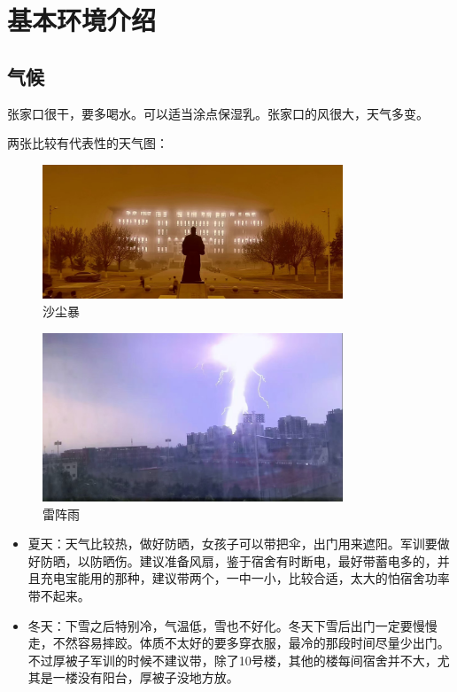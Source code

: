 \documentclass[12pt]{article} %
\begin{document}
	
\section{基本环境介绍} 
	\subsection{气候}
	
	张家口很干，要多喝水。可以适当涂点保湿乳。张家口的风很大，天气多变。
	
		两张比较有代表性的天气图：
	\begin{figure}[!h]
		\centering
		\includegraphics[width=0.8\textwidth]{20256252.jpg}
		\caption{沙尘暴} %
	\end{figure}
	\begin{figure}[!h]
		\centering
		\includegraphics[width=0.8\textwidth]{2025625.jpg}
		\caption{雷阵雨} %
	\end{figure}
	
	\begin{itemize}
	\item 夏天：天气比较热，做好防晒，女孩子可以带把伞，出门用来遮阳。军训要做好防晒，以防晒伤。建议准备风扇，鉴于宿舍有时断电，最好带蓄电多的，并且充电宝能用的那种，建议带两个，一中一小，比较合适，太大的怕宿舍功率带不起来。\\
	
	\item 冬天：下雪之后特别冷，气温低，雪也不好化。冬天下雪后出门一定要慢慢走，不然容易摔跤。体质不太好的要多穿衣服，最冷的那段时间尽量少出门。不过厚被子军训的时候不建议带，除了10号楼，其他的楼每间宿舍并不大，尤其是一楼没有阳台，厚被子没地方放。\\
	


	\end{itemize}
\end{document}
